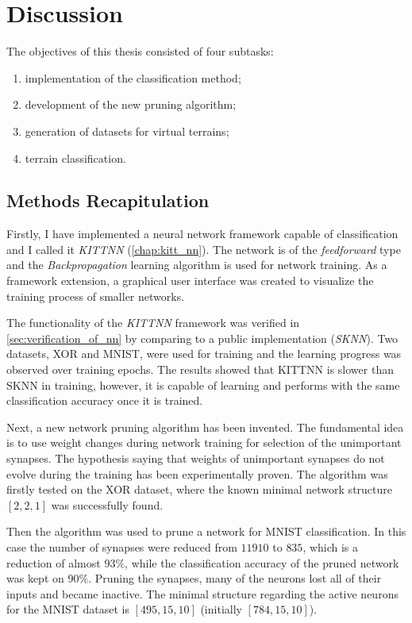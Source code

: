 \chapter{Discussion} \label{chap:discussion}
The objectives of this thesis consisted of four subtasks:

\begin{enumerate}
\item implementation of the classification method;
\item development of the new pruning algorithm;
\item generation of datasets for virtual terrains;
\item terrain classification.
\end{enumerate}

\section{Methods Recapitulation} \label{sec:dis:methods_recap}
Firstly, I have implemented a neural network framework capable of classification and I called it \textit{KITTNN} (\cref{chap:kitt_nn}). The network is of the \textit{feedforward} type and the \textit{Backpropagation} learning algorithm is used for network training. As a framework extension, a graphical user interface was created to visualize the training process of smaller networks.

The functionality of the \textit{KITTNN} framework was verified in \cref{sec:verification_of_nn} by comparing to a public implementation (\textit{SKNN}). Two datasets, XOR and MNIST, were used for training and the learning progress was observed over training epochs. The results showed that KITTNN is slower than SKNN in training, however, it is capable of learning and performs with the same classification accuracy once it is trained.

Next, a new network pruning algorithm has been invented. The fundamental idea is to use weight changes during network training for selection of the unimportant synapses. The hypothesis saying that weights of unimportant synapses do not evolve during the training has been experimentally proven. The algorithm was firstly tested on the XOR dataset, where the known minimal network structure $ [2, 2, 1] $ was successfully found.

Then the algorithm was used to prune a network for MNIST classification. In this case the number of synapses were reduced from $ 11910 $ to $ 835 $, which is a reduction of almost $ 93\% $, while the classification accuracy of the pruned network was kept on $ 90\% $. Pruning the synapses, many of the neurons lost all of their inputs and became inactive. The minimal structure regarding the active neurons for the MNIST dataset is $ [495, 15, 10] $ (initially $ [784, 15, 10] $). 

